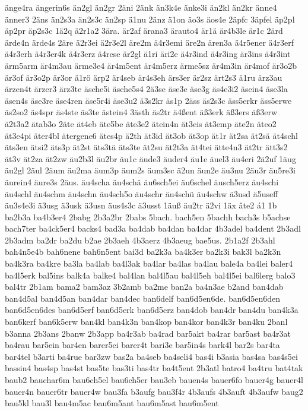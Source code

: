 {änge4ra
ängerin6s
än2gl
än2gr
2äni
2änk
än3k4e
änke3i
än2kl
än2kr
änne4
änner3
2äns
än2s3a
än2s3c
än2sp
ä1nu
2änz
ä1on
äo3s
äos4e
2äpfc
3äpfel
äp2pl
äp2pr
äp2s3c
1ä2q
ä2r1a2
3ära.
är2af
ärana3
ärauto4
är1ä
är4b3le
är1c
2ärd
ärde4n
ärde4s
2äre
ä2r3ei
ä2r3e2l
äre2m
ä4r3emi
äre2n
ären3a
ä4r5ener
ä4r3erf
ä4r3erh
ä4r3er4k
ä4r3erz
ä4rese
är2gl
ä1ri
äri2e
ä4r3ind
ä4r3ing
är3ins
ä4r3int
ärm5arm
är4m3au
ärme3e4
är4m5ent
är4m5erz
ärme5sz
är4m3in
är4mof
är3o2b
är3of
är3o2p
är3or
ä1rö
ärp2
är4seb
är4s3eh
ärs3er
är2sz
ärt2s3
ä1ru
ärz3au
ärzen4t
ärzer3
ärz3te
äsche5i
äsche5s4
2ä3se
äse3e
äse3g
äs4e3i2
äsein4
äse3la
äsen4s
äse3re
äse4ren
äse5r4i
äse3u2
ä3s2kr
äs1p
2äss
äs2s3c
äss5erkr
äss5erwe
äs2so2
äs4spr
äs4ste
äs3te
ästein4
3ästh
äs2tr
ä4ßent
äß3erk
äß3ers
äß3erw
ä2t3a2
ätab3o
2äte
ät4eb
äte5be
äte3e2
ätein4n
ät3eis
ät3emp
äte2n
äteo2
ät3e4pi
äter4bl
ätergene6
ätes4p
ä2th
ät3id
ät3ob
ät3op
ät1r
ät2sa
ät2sä
ät4schl
äts3en
ätsi2
äts3p
ät2st
äts3tä
äts3te
ät2su
ät2t3a
ät4tei
ätte4n3
ät2tr
ätt3s2
ät3v
ät2za
ät2zw
äu2b3l
äu2br
äu1c
äude3
äuder4
äu1e
äuel3
äu4eri
2ä2uf
1äug
äu2gl
2äul
2äum
äu2ma
äum3p
äum2s
äum3sc
ä2un
äun2e
äu3nu
2äu3r
äu5re3i
äurein4
äure3s
2äus.
äu4scha
äu4schä
äu6sch5ei
äu6schel
äusch5erz
äu4schi
äu4schl
äu4schm
äu4schn
äu4sch5o
äu4schr
äu4schü
äu4schw
ä3usd
ä5useff
äu3s4e3i
ä3usg
ä3usk
ä3usn
äus4s3c
ä3usst
1äuß
äu2tr
ä2vi
1äx
âte2
á1
1b
ba2b3a
ba4b3er4
2babg
2b3a2br
2babs
5bach.
bach5en
5bachh
bach3s
b5achse
bach7ter
ba4ck5er4
backs4
bad3a
ba4dab
ba4dan
ba4dar
4b3adel
ba4dent
2b3adl
2b3adm
ba2dr
ba2du
b2ae
2b3aeh
4b3aerz
4b3aeug
bae5us.
2b1a2f
2b3ahl
bah4n5e4b
bah6nene
bah6n5ent
bai3d
ba2k3a
ba4k3er
ba2k3i
bak3l
ba2k3n
ba4k3ra
ba4kre
ba3la
ba4lab
ba4l3ak
ba4lar
ba4las
ba4lau
bale4a
ba4lei
baler4
ba4l5erk
bal5ins
balk4a
balke4
bal4lan
bal4l5au
bal4l5eh
bal4l5ei
bal6lerg
balo3
bal4tr
2b1am
bama2
bam3az
3b2amb
ba2me
ban2a
ba4n3ae
b2and
ban4dab
ban4d5al
ban4d5an
ban4dar
ban4dec
ban6delf
ban6d5en6de.
ban6d5en6den
ban6d5en6des
ban6d5erf
ban6d5erk
ban6d5erz
ban4dob
ban4dr
ban4du
ban4k3a
ban6kerf
ban6k5erw
ban4kl
ban4k3n
ban4kop
ban4kor
ban4k3r
ban4ku
2banl
b3anna
2b3ans
2banw
2b3app
ba4r3ab
ba4rad
bar5akt
ba4rar
bar5ast
ba4r3at
ba4rau
bar5ein
bar4en
barer5ei
barer4t
bari3e
bar5in4s
bark4l
bar2s
bar4ta
bar4tel
b3arti
ba4rue
bar3zw
bas2a
ba4seb
ba4seli4
bas4i
b3asia
bas4sa
bas4s5ei
bassin4
bas4sp
bas4st
bas5te
bas3ti
bas4tr
ba4t5ent
2b3atl
batro4
ba4tru
bat4tak
baub2
bauchar6m
bau6ch5el
bau6ch5er
bau3eb
bauen4s
bauer6fo
bauer4g
bauer4l
bauer4n
bauer6tr
bauer4w
bau3fa
b3aufg
bau3f4r
4b3aufs
4b3auft
4b3aufw
baug2
bau5kl
bau3l
bau4m5ac
bau6m5ant
bau6m5ast
bau6m5ent
}
